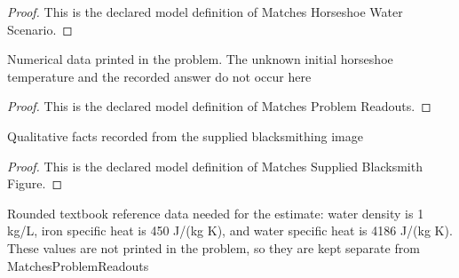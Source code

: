 \begin{proof}
  This is the declared model definition of Matches Horseshoe Water Scenario.
\end{proof}
\begin{definition}
  \label{def:physics:phyx-mini-0485:phyxminiproblems-problemphyxmini0485-matchesproblemreadouts}
  Numerical data printed in the problem. The unknown initial horseshoe temperature and the recorded answer do not occur here
\end{definition}
\begin{proof}
  This is the declared model definition of Matches Problem Readouts.
\end{proof}
\begin{definition}
  \label{def:physics:phyx-mini-0485:phyxminiproblems-problemphyxmini0485-matchessuppliedblacksmithfigure}
  Qualitative facts recorded from the supplied blacksmithing image
\end{definition}
\begin{proof}
  This is the declared model definition of Matches Supplied Blacksmith Figure.
\end{proof}
\begin{definition}
  \label{def:physics:phyx-mini-0485:phyxminiproblems-problemphyxmini0485-usesreferenceironandwaterthermaldata}
  Rounded textbook reference data needed for the estimate: water density is 1 kg/L, iron specific heat is 450 J/(kg K), and water specific heat is 4186 J/(kg K). These values are not printed in the problem, so they are kept separate from MatchesProblemReadouts
\end{definition}
